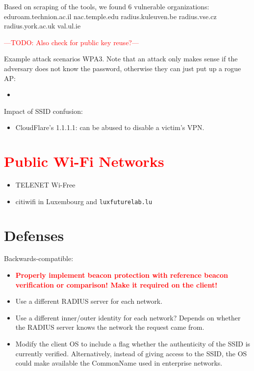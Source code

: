 \documentclass[sigconf,review]{acmart}
\newcommand{\wifi}{\mbox{Wi-Fi}}
\DeclareRobustCommand{\red}[1]{\textcolor{red}{#1}}
\begin{document}
Based on scraping of the tools, we found 6 vulnerable organizations:
eduroam.technion.ac.il
nac.temple.edu
radius.kuleuven.be
radius.vse.cz
radius.york.ac.uk
val.ul.ie

\red{---TODO: Also check for public key reuse?---}

Example attack scenarios WPA3.
Note that an attack only makes sense if the adversary does not know the password, otherwise they can just put up a rogue AP:
\begin{itemize}
	\item 
\end{itemize}

Impact of SSID confusion:
\begin{itemize}
	\item CloudFlare's 1.1.1.1: can be abused to disable a victim's VPN.
\end{itemize}

\section{\red{Public \wifi{} Networks}}

\begin{itemize}
	\item TELENET Wi-Free
	\item citiwifi in Luxembourg and \verb|luxfuturelab.lu|
\end{itemize}

\section{Defenses}

Backwards-compatible:
\begin{itemize}
	\item \textbf{\red{Properly implement beacon protection with reference beacon verification or comparison! Make it required on the client!}}
	\item Use a different RADIUS server for each network.
	\item Use a different inner/outer identity for each network?
	Depends on whether the RADIUS server knows the network the request came from.
	\item Modify the client OS to include a flag whether the authenticity of the SSID is currently verified.
	Alternatively, instead of giving access to the SSID, the OS could make available the CommonName used in enterprise networks.
\end{itemize}
\end{document}
